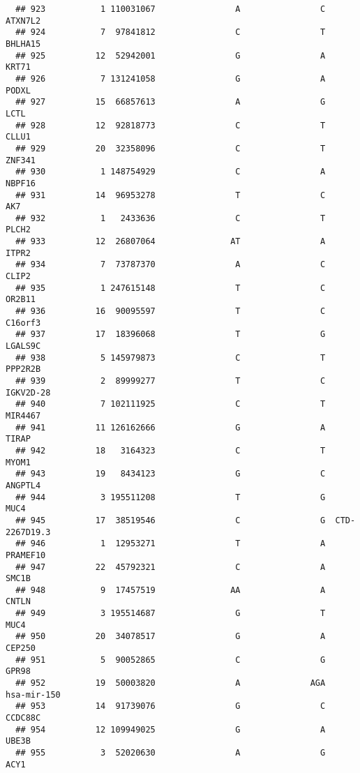 \documentclass[12pt,twoside]{reedthesis}
\theoremstyle{definition}
\theoremstyle{definition}
\theoremstyle{remark}
\begin{document}
\begin{verbatim}
  ## 923           1 110031067                A                C        ATXN7L2
  ## 924           7  97841812                C                T        BHLHA15
  ## 925          12  52942001                G                A          KRT71
  ## 926           7 131241058                G                A          PODXL
  ## 927          15  66857613                A                G           LCTL
  ## 928          12  92818773                C                T          CLLU1
  ## 929          20  32358096                C                T         ZNF341
  ## 930           1 148754929                C                A         NBPF16
  ## 931          14  96953278                T                C            AK7
  ## 932           1   2433636                C                T          PLCH2
  ## 933          12  26807064               AT                A          ITPR2
  ## 934           7  73787370                A                C          CLIP2
  ## 935           1 247615148                T                C         OR2B11
  ## 936          16  90095597                T                C        C16orf3
  ## 937          17  18396068                T                G        LGALS9C
  ## 938           5 145979873                C                T        PPP2R2B
  ## 939           2  89999277                T                C      IGKV2D-28
  ## 940           7 102111925                C                T        MIR4467
  ## 941          11 126162666                G                A          TIRAP
  ## 942          18   3164323                C                T          MYOM1
  ## 943          19   8434123                G                C        ANGPTL4
  ## 944           3 195511208                T                G           MUC4
  ## 945          17  38519546                C                G  CTD-2267D19.3
  ## 946           1  12953271                T                A       PRAMEF10
  ## 947          22  45792321                C                A          SMC1B
  ## 948           9  17457519               AA                A          CNTLN
  ## 949           3 195514687                G                T           MUC4
  ## 950          20  34078517                G                A         CEP250
  ## 951           5  90052865                C                G          GPR98
  ## 952          19  50003820                A              AGA    hsa-mir-150
  ## 953          14  91739076                G                C        CCDC88C
  ## 954          12 109949025                G                A          UBE3B
  ## 955           3  52020630                A                G           ACY1

\end{verbatim}
\end{document}
